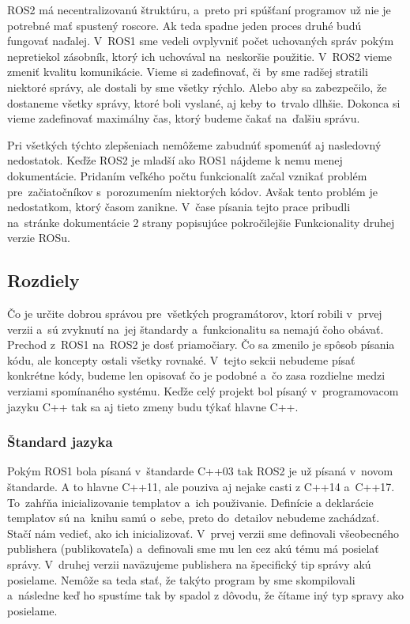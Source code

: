 ROS2 má necentralizovanú štruktúru, a~preto pri spúšťaní programov už nie je potrebné mať spustený roscore. Ak teda spadne jeden proces druhé budú
fungovať naďalej. V~ROS1 sme vedeli ovplyvniť počet uchovaných správ pokým nepretiekol zásobník, ktorý ich uchovával na~neskoršie použitie. V~ROS2
vieme zmeniť kvalitu komunikácie. Vieme si zadefinovať, či~by sme radšej stratili niektoré správy, ale dostali by sme všetky rýchlo. Alebo aby
sa zabezpečilo, že dostaneme všetky správy, ktoré boli vyslané, aj keby to~trvalo dlhšie. Dokonca si vieme zadefinovať maximálny čas, ktorý budeme
čakať na~ďalšiu správu.

Pri všetkých týchto zlepšeniach nemôžeme zabudnúť spomenúť aj nasledovný nedostatok. Keďže ROS2 je mladší ako ROS1 nájdeme k nemu menej dokumentácie.
Pridaním veľkého počtu funkcionalít začal vznikať problém pre~začiatočníkov s~porozumením niektorých kódov. Avšak tento problém je nedostatkom,
ktorý časom zanikne. V~čase písania tejto prace pribudli na~stránke dokumentácie 2 strany popisujúce pokročilejšie Funkcionality druhej verzie ROSu.

\subsection{Rozdiely}

Čo je určite dobrou správou pre~všetkých programátorov, ktorí robili v~prvej verzii a~sú zvyknutí na~jej štandardy a~funkcionalitu sa nemajú
čoho obávať. Prechod z~ROS1 na~ROS2 je dosť priamočiary. Čo sa zmenilo je spôsob písania kódu, ale koncepty ostali všetky rovnaké. V~tejto
sekcii nebudeme písať konkrétne kódy, budeme len opisovať čo je podobné a~čo zasa rozdielne medzi verziami spomínaného systému. Keďže celý
projekt bol písaný v~programovacom jazyku C++ tak sa aj tieto zmeny budu týkať hlavne C++.

\subsubsection{Štandard jazyka}

	Pokým ROS1 bola písaná v~štandarde C++03 tak ROS2 je už písaná v~novom štandarde. A to hlavne C++11, ale pouziva aj nejake casti z C++14
	a~C++17. To~zahŕňa inicializovanie templatov a~ich použivanie. Definície a deklarácie templatov sú na~knihu samú o~sebe, preto do~detailov
	nebudeme zachádzať. Stačí nám vedieť, ako ich inicializovať. V~prvej verzii sme definovali všeobecného publishera (publikovateľa) a~definovali
	sme mu len cez akú tému má posielať správy. V~druhej verzii naväzujeme publishera na špecifický tip správy akú posielame. Nemôže sa teda stať,
	že takýto program by sme skompilovali a~následne keď ho spustíme tak by spadol z dôvodu, že čítame iný typ spravy ako posielame.

